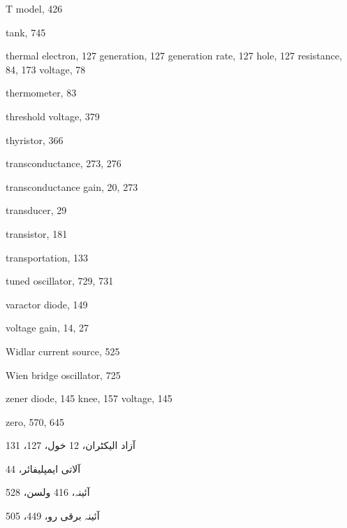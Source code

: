 \begin{theindex}
\begin{otherlanguage}{english}
  \indexspace

  \item T model, 426
  \item tank, 745
  \item thermal
    \subitem electron, 127
    \subitem generation, 127
    \subitem generation rate, 127
    \subitem hole, 127
    \subitem resistance, 84, 173
    \subitem voltage, 78
  \item thermometer, 83
  \item threshold voltage, 379
  \item thyristor, 366
  \item transconductance, 273, 276
  \item transconductance gain, 20, 273
  \item transducer, 29
  \item transistor, 181
  \item transportation, 133
  \item tuned oscillator, 729, 731

  \indexspace

  \item varactor diode, 149
  \item voltage gain, 14, 27

  \indexspace

  \item Widlar current source, 525
  \item Wien bridge oscillator, 725

  \indexspace

  \item zener
    \subitem diode, 145
    \subitem knee, 157
    \subitem voltage, 145
  \item zero, 570, 645

\end{otherlanguage}

\newpage
\twocolumn

\item آزاد 
     \subitem الیکٹران، 12 
     \subitem خول، 127، 131
\item آلاتی ایمپلیفائر، 44
\item آئینہ، 416 
     \subitem ولسن، 528
\item آئینہ برقی رو، 449، 505

\indexspace


\end{theindex}
